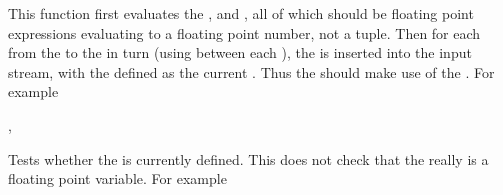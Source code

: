 \documentclass[oneside]{book}
\begin{document}
\begin{function}{\FpStepVariable}
\begin{syntax}
     
\end{syntax}
This function first evaluates the , 
and , all of which should be floating point
expressions evaluating to a floating point number, not a tuple.
Then for each  from the  to the
 in turn (using  between each
), the  is inserted into the input stream,
with the  defined as the current .  Thus
the  should make use of the .
For example
\begin{demohigh}
\IgnoreSpacesOn
\TlClear\lTmpaTl
{}\lTmpiTl{
  \TlPutRight\lTmpaTl{\Value\lTmpiTl}
  \TlPutRight\lTmpaTl{~}
}
\Result{\Value\lTmpaTl}
\IgnoreSpacesOff
\end{demohigh}
\end{function}

\begin{function}{\FpIfExist,\FpIfExistTF}
\begin{syntax}
 
   
\end{syntax}
Tests whether the  is currently defined.  This does not
check that the  really is a floating point variable.
For example
\begin{demohigh}
\FpIfExistTF{}
\FpIfExistTF{}
\end{demohigh}
\end{function}
\end{document}
